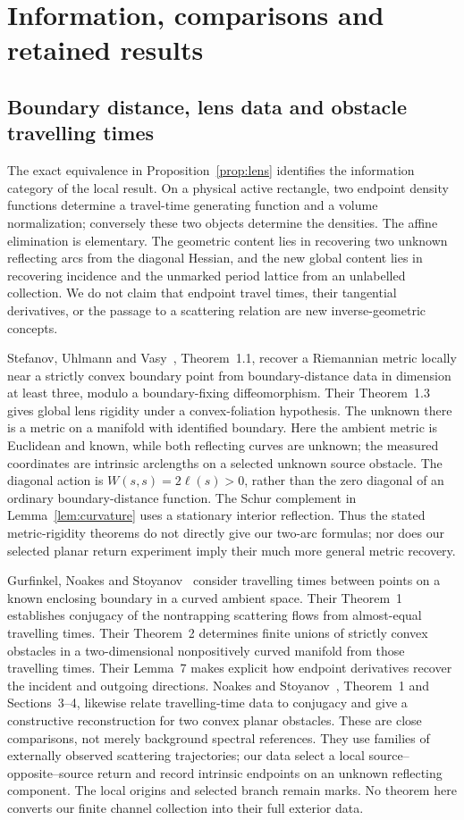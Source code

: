 \section{Information, comparisons and retained results}
\label{sec:comparison}
\subsection{Boundary distance, lens data and obstacle travelling times}
The exact equivalence in Proposition~\ref{prop:lens} identifies the
information category of the local result. On a physical active rectangle,
two endpoint density functions determine a travel-time generating function
and a volume normalization; conversely these two objects determine the
densities. The affine elimination is elementary. The geometric content
lies in recovering two unknown reflecting arcs from the diagonal Hessian,
and the new global content lies in recovering incidence and the unmarked
period lattice from an unlabelled collection. We do not claim that endpoint
travel times, their tangential derivatives, or the passage to a scattering
relation are new inverse-geometric concepts.

Stefanov, Uhlmann and Vasy~\cite{SUV}, Theorem~1.1, recover a Riemannian
metric locally near a strictly convex boundary point from boundary-distance
data in dimension at least three, modulo a boundary-fixing diffeomorphism.
Their Theorem~1.3 gives global lens rigidity under a convex-foliation
hypothesis. The unknown there is a metric on a manifold with identified
boundary. Here the ambient metric is Euclidean and known, while both
reflecting curves are unknown; the measured coordinates are intrinsic
arclengths on a selected unknown source obstacle. The diagonal action
is $W(s,s)=2\ell(s)>0$, rather than the zero diagonal of an ordinary
boundary-distance function. The Schur complement in Lemma~\ref{lem:curvature}
uses a stationary interior reflection. Thus the stated metric-rigidity
theorems do not directly give our two-arc formulas; nor does our selected
planar return experiment imply their much more general metric recovery.

Gurfinkel, Noakes and Stoyanov~\cite{GNS} consider travelling times between
points on a known enclosing boundary in a curved ambient space. Their
Theorem~1 establishes conjugacy of the nontrapping scattering flows from
almost-equal travelling times. Their Theorem~2 determines finite unions of
strictly convex obstacles in a two-dimensional nonpositively curved
manifold from those travelling times. Their Lemma~7 makes explicit how
endpoint derivatives recover the incident and outgoing directions.
Noakes and Stoyanov~\cite{NS}, Theorem~1 and Sections~3--4, likewise relate
travelling-time data to conjugacy and give a constructive reconstruction
for two convex planar obstacles. These are close comparisons, not merely
background spectral references. They use families of externally observed
scattering trajectories; our data select a local source--opposite--source
return and record intrinsic endpoints on an unknown reflecting component.
The local origins and selected branch remain marks. No theorem here
converts our finite channel collection into their full exterior data.

